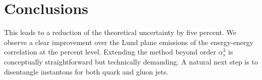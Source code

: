 \section{Conclusions}\label{sec:conclusions}

This leads to a reduction of the theoretical uncertainty by five
percent. We observe a clear improvement over the Lund plane emissions of
the energy-energy correlation at the percent level. Extending the method
beyond order $\alpha_s^3$ is conceptually straightforward but
technically demanding. A natural next step is to disentangle instantons
for both quark and gluon jets.

